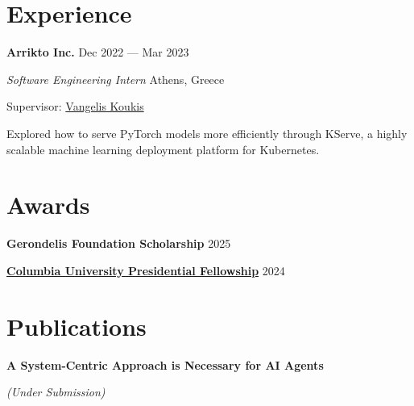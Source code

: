 \documentclass[margin,12pt]{resume}
\newcommand{\cvName}{Nikos Pagonas}
\newcommand{\descriptionVSpace}{\vspace{0.5ex}\xspace}
\newcommand{\subsectionVSpace}{\vspace{3.5ex}\xspace}
\newcommand{\sectionVSpace}{\vspace{1ex}\xspace} %
\newcommand{\sectionVSpaceCorrection}{\vspace{-3.5ex}} %
\newcommand{\header}[1]{\textbf{#1}\xspace}
\newcommand{\authors}[1]{#1\xspace}
\newcommand{\company}[1]{\header{#1}\xspace}
\newcommand{\equalContributionNote}{(*equal contribution)\xspace}
\newcommand{\fellowship}[1]{\header{#1}\xspace}
\newcommand{\interval}[2]{#1 --- #2\xspace}
\newcommand{\me}{\textbf{\cvName}\xspace}
\newcommand{\paperTitle}[1]{\header{#1}\xspace}
\newcommand{\place}[1]{#1\xspace}
\newcommand{\role}[1]{\textit{#1}\xspace}
\newcommand{\stitle}[1]{#1:\xspace}
\newcommand{\underSubmission}{\textit{(Under Submission)}\xspace}
\newenvironment{rSubsection}{}{\par\subsectionVSpace}
\newenvironment{rSection}[1]{\sectionVSpaceCorrection\section{#1}\xspace}{\sectionVSpace\par}
\newenvironment{jobDuties}{\descriptionVSpace}{\par}
\begin{document}
\begin{resume}
\begin{rSection}{Experience}



        \begin{rSubsection}
            \company{Arrikto Inc.} \hfill \interval{Dec 2022}{Mar 2023}

            \role{Software Engineering Intern} \hfill \place{Athens, Greece}

            \stitle{Supervisor} \href{https://www.linkedin.com/in/vkoukis/}{Vangelis Koukis}

            \begin{jobDuties}
                Explored how to serve PyTorch models more efficiently through KServe, a highly scalable machine learning deployment platform for Kubernetes.
            \end{jobDuties}
        \end{rSubsection}
    \end{rSection}


    \begin{rSection}{Awards}
        \begin{rSubsection}
            \fellowship{Gerondelis Foundation Scholarship} \hfill 2025
        \end{rSubsection}

        \begin{rSubsection}
            \fellowship{\href{https://www.cs.columbia.edu/2024/meet-the-scholars-phd-students-with-prestigious-fellowships/}{Columbia University Presidential Fellowship}} \hfill 2024
        \end{rSubsection}
    \end{rSection}

    \begin{rSection}{Publications}
        \begin{rSubsection}
            \paperTitle{A System-Centric Approach is Necessary for AI Agents}

            \underSubmission



\end{rSubsection}
\end{rSection}
\end{resume}
\end{document}
